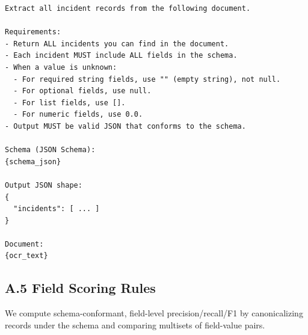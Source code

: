 \begingroup
\small
\begin{verbatim}
Extract all incident records from the following document.

Requirements:
- Return ALL incidents you can find in the document.
- Each incident MUST include ALL fields in the schema.
- When a value is unknown:
  - For required string fields, use "" (empty string), not null.
  - For optional fields, use null.
  - For list fields, use [].
  - For numeric fields, use 0.0.
- Output MUST be valid JSON that conforms to the schema.

Schema (JSON Schema):
{schema_json}

Output JSON shape:
{
  "incidents": [ ... ]
}

Document:
{ocr_text}
\end{verbatim}
\endgroup

\subsection*{A.5 Field Scoring Rules}

We compute schema-conformant, field-level precision/recall/F1 by canonicalizing records under the schema and comparing multisets of field-value pairs.

